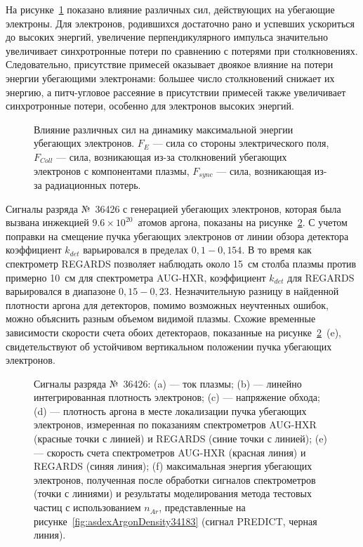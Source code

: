 На рисунке~\ref{fig:asdexForcesEffectsSimulation} показано влияние различных сил, действующих на убегающие электроны. Для электронов, родившихся достаточно рано и успевших ускориться до высоких энергий, увеличение перпендикулярного импульса значительно увеличивает синхротронные потери по сравнению с потерями при столкновениях. Следовательно, присутствие примесей оказывает двоякое влияние на потери энергии убегающими электронами: большее число столкновений снижает их энергию, а питч-угловое рассеяние в присутствии примесей также увеличивает синхротронные потери, особенно для электронов высоких энергий.

\begin{figure}[ht!]
  \caption{ Влияние различных сил на динамику максимальной энергии убегающих электронов. $F_E$ --- сила со стороны электрического поля, $F_{Coll}$ --- сила, возникающая из-за столкновений убегающих электронов с компонентами плазмы, $F_{sync}$ --- сила, возникающая из-за радиационных потерь.~\cite{Shevelev2021} }
  \label{fig:asdexForcesEffectsSimulation}
\end{figure}

Сигналы разряда №~36426 с генерацией убегающих электронов, которая была вызвана инжекцией $9.6 \times 10^{20}$~атомов аргона, показаны на рисунке~\ref{fig:asdexPlasmaParamsPulse36426}. С учетом поправки на смещение пучка убегающих электронов от линии обзора детектора коэффициент $k_{det}$ варьировался в пределах $0,1-0,154$. В то время как спектрометр REGARDS позволяет наблюдать около 15~см столба плазмы против примерно 10~см для спектрометра AUG-HXR, коэффициент $k_{det}$ для REGARDS варьировался в диапазоне $0,15-0,23$. Незначительную разницу в найденной плотности аргона для детекторов, помимо возможных неучтенных ошибок, можно объяснить разным объемом видимой плазмы. Схожие временные зависимости скорости счета обоих детектораов, показанные на рисунке~\ref{fig:asdexPlasmaParamsPulse36426}~(e), свидетельствуют об устойчивом вертикальном положении пучка убегающих электронов.

\begin{figure}[ht!]
  \caption{ Сигналы разряда №~36426: (a) --- ток плазмы; (b) --- линейно интегрированная плотность электронов; (c) --- напряжение обхода; (d) --- плотность аргона в месте локализации пучка убегающих электронов, измеренная по показаниям спектрометров AUG-HXR (красные точки с линией) и REGARDS (синие точки с линией); (e) --- скорость счета спектрометров AUG-HXR (красная линия) и REGARDS (синяя линия); (f) максимальная энергия убегающих электронов, полученная после обработки сигналов спектрометров (точки с линиями) и результаты моделирования метода тестовых частиц с использованием $n_{Ar}$, представленные на рисунке~\ref{fig:asdexArgonDensity34183} (сигнал PREDICT, черная линия).~\cite{Shevelev2021} }
  \label{fig:asdexPlasmaParamsPulse36426}
\end{figure}

